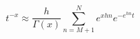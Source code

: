 \documentclass{jsarticle}
\begin{document}
\begin{equation}
  t^{-x} \approx \frac{h}{\Gamma (x)} \sum_{n=M+1}^{N} e^{xhn} e^{-e^{hn}t}
\end{equation}
\end{document}
